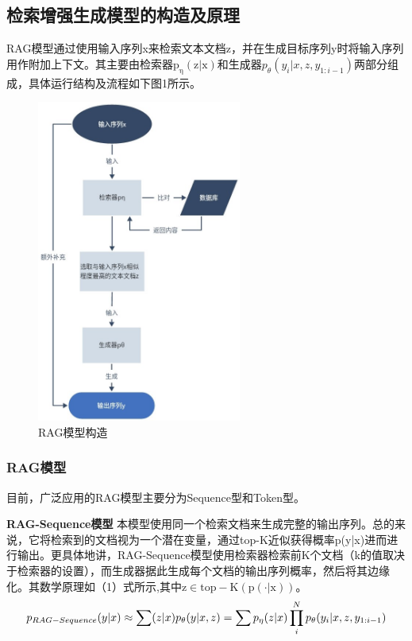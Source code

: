 \documentclass[zihao=-4]{ctexart}
\begin{document}
\begin{spacing}{1.5}
\subsection{检索增强生成模型的构造及原理}
  RAG模型通过使用输入序列x来检索文本文档z，并在生成目标序列y时将输入序列用作附加上下文。其主要由检索器$\mathrm{p_{\eta}(z|x)}$和生成器$p_{\theta }(y_{i}|x,z,y_{1:i-1})$两部分组成，具体运行结构及流程如下图1所示。
\begin{figure}[H] %
    \centering %
    \includegraphics[width=0.6\textwidth]{RAG模型原理.jpg} %
    \caption{RAG模型构造} %
    \label{RAGmodel} %
\end{figure}
\subsubsection{RAG模型}
  目前，广泛应用的RAG模型主要分为Sequence型和Token型。

\textbf{RAG-Sequence模型 }  本模型使用同一个检索文档来生成完整的输出序列。总的来说，它将检索到的文档视为一个潜在变量，通过top-K近似获得概率p(y|x)进而进行输出。更具体地讲，RAG-Sequence模型使用检索器检索前K个文档（k的值取决于检索器的设置），而生成器据此生成每个文档的输出序列概率，然后将其边缘化。其数学原理如（1）式所示,其中$\mathrm{z\in top-K(p(\cdot |x))} $。
\begin{align}
{\Huge p_{RAG-Sequence} (y|x)\approx\sum(z|x)p_{\theta } (y|x, z)  =  \sum p_{\eta }  (z|x)\prod_{i}^{N} p_{\theta }  (y_{i} |x, z,y_{1:i-1} )  } 
\label{eq1}
\end{align}


\end{spacing}
\end{document}
